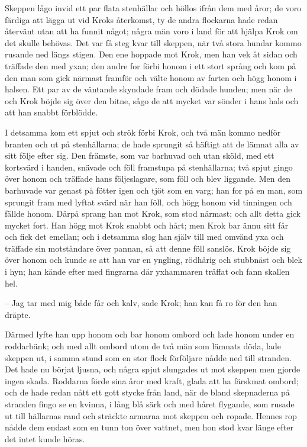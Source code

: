 \initial Skeppen lågo invid ett par flata stenhällar och höllos ifrån dem med åror; de voro färdiga att lägga ut vid Kroks återkomst, ty de andra flockarna hade redan återvänt utan att ha funnit något; några män voro i land för att hjälpa Krok om det skulle behövas. Det var få steg kvar till skeppen, när två stora hundar kommo rusande ned längs stigen. Den ene hoppade mot Krok, men han vek åt sidan och träffade den med yxan; den andre for förbi honom i ett stort språng och kom på den man som gick närmast framför och välte honom av farten och högg honom i halsen. Ett par av de väntande skyndade fram och dödade hunden; men när de och Krok böjde sig över den bitne, sågo de att mycket var sönder i hans hals och att han snabbt förblödde.

\initial I detsamma kom ett spjut och strök förbi Krok, och två män kommo nedför branten och ut på stenhällarna; de hade sprungit så häftigt att de lämnat alla av sitt följe efter sig. Den främste, som var barhuvad och utan sköld, med ett kortsvärd i handen, snävade och föll framstupa på stenhällarna; två spjut gingo över honom och träffade hans följeslagare, som föll och blev liggande. Men den barhuvade var genast på fötter igen och tjöt som en varg; han for på en man, som sprungit fram med lyftat svärd när han föll, och högg honom vid tinningen och fällde honom. Därpå sprang han mot Krok, som stod närmast; och allt detta gick mycket fort. Han högg mot Krok snabbt och hårt; men Krok bar ännu sitt får och fick det emellan; och i detsamma slog han själv till med omvänd yxa och träffade sin motståndare över pannan, så att denne föll sanslös. Krok böjde sig över honom och kunde se att han var en yngling, rödhårig och stubbnäst och blek i hyn; han kände efter med fingrarna där yxhammaren träffat och fann skallen hel.

– Jag tar med mig både får och kalv, sade Krok; han kan få ro för den han dräpte.

\initial Därmed lyfte han upp honom och bar honom ombord och lade honom under en roddarbänk; och med allt ombord utom de två män som lämnats döda, lade skeppen ut, i samma stund som en stor flock förföljare nådde ned till stranden. Det hade nu börjat ljusna, och några spjut slungades ut mot skeppen men gjorde ingen skada. Roddarna förde sina åror med kraft, glada att ha färskmat ombord; och de hade redan nått ett gott stycke från land, när de bland skepnaderna på stranden fingo se en kvinna, i lång blå särk och med håret flygande, som rusade ut till hällarnas rand och sträckte armarna mot skeppen och ropade. Hennes rop nådde dem endast som en tunn ton över vattnet, men hon stod kvar länge efter det intet kunde höras.

